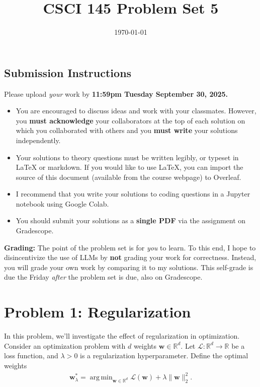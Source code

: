 \documentclass{article}
\title{CSCI 145 Problem Set 5}
\author{} %
\date{\today}
\DeclareMathOperator*{\argmin}{arg\,min}
\begin{document}
\maketitle

\subsection*{Submission Instructions}

Please upload \textit{your} work by
\textbf{11:59pm Tuesday September 30, 2025.}
\begin{itemize}
\item You are encouraged to discuss ideas
and work with your classmates. However, you
\textbf{must acknowledge} your collaborators
at the top of each solution on which
you collaborated with others 
and you \textbf{must write} your solutions
independently.
\item Your solutions to theory questions must
be written legibly, or typeset in LaTeX or markdown.
If you would like to use LaTeX, you can import the source of this document (available from the course webpage) to Overleaf.
\item I recommend that you write your solutions to coding questions in a Jupyter notebook using Google Colab.
\item You should submit your solutions as a \textbf{single PDF} via the assignment on Gradescope.
\end{itemize}

\noindent
\textbf{Grading:} The point of the problem set is for \textit{you} to learn. To this end, I hope to disincentivize the use of LLMs by \textbf{not} grading your work for correctness. Instead, you will grade your own work by comparing it to my solutions. This self-grade is due the Friday \textit{after} the problem set is due, also on Gradescope.

\newpage
\section*{Problem 1: Regularization}

In this problem, we'll investigate the effect of regularization in optimization.
Consider an optimization problem with $d$ weights $\mathbf{w} \in \mathbb{R}^d$.
Let $\mathcal{L}: \mathbb{R}^d \to \mathbb{R}$ be a loss function, and $\lambda > 0$ is a regularization hyperparameter.
Define the optimal weights
\begin{align}
    \mathbf{w}^*_\lambda = \argmin_{\mathbf{w} \in \mathbb{R}^d} 
    \mathcal{L}(\mathbf{w}) + \lambda \| \mathbf{w}\|_2^2.
\end{align}
\end{document}
